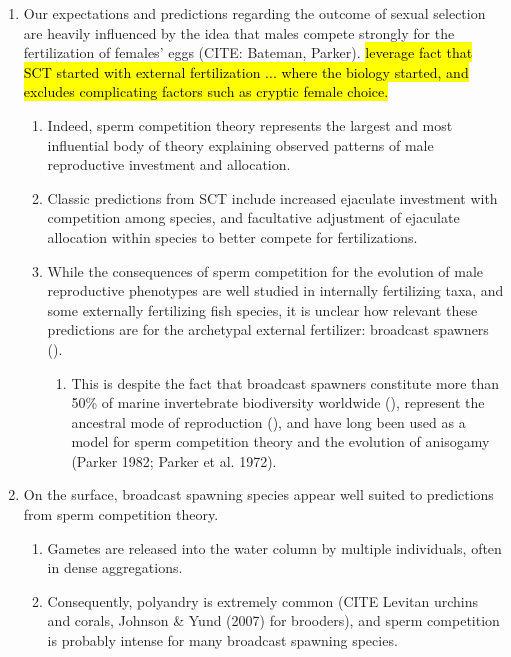 \documentclass{article}
\begin{document}
\begin{enumerate}
	\item Our expectations and predictions regarding the outcome of sexual selection are heavily influenced by the idea that males compete strongly for the fertilization of females' eggs (CITE: Bateman, Parker). \hl{leverage fact that SCT started with external fertilization ... where the biology started, and excludes complicating factors such as cryptic female choice.}
		\begin{enumerate}
			\item Indeed, sperm competition theory represents the largest and most influential body of theory explaining observed patterns of male reproductive investment and allocation. 
			\item Classic predictions from SCT include increased ejaculate investment with competition among species, and facultative adjustment of ejaculate allocation within species to better compete for fertilizations.
			\item While the consequences of sperm competition for the evolution of male reproductive phenotypes are well studied in internally fertilizing taxa, and some externally fertilizing fish species, it is unclear how relevant these predictions are for the archetypal external fertilizer: broadcast spawners (\citealt{BodeMarshall2007,Olito2015}). 
				\begin{enumerate}
					\item This is despite the fact that broadcast spawners constitute more than 50\% of marine invertebrate biodiversity worldwide (\citealt{MonroMarshall2015}), represent the ancestral mode of reproduction (), and have long been used as a model for sperm competition theory and the evolution of anisogamy (Parker 1982; Parker et al. 1972).
				\end{enumerate}
		\end{enumerate}

	\item On the surface, broadcast spawning species appear well suited to predictions from sperm competition theory.
		\begin{enumerate}
			\item Gametes are released into the water column by multiple individuals, often in dense aggregations.
			\item Consequently, polyandry is extremely common (CITE Levitan urchins and corals, Johnson \& Yund (2007) for brooders), and sperm competition is probably intense for many broadcast spawning species.
		\end{enumerate}


\end{enumerate}
\end{document}
